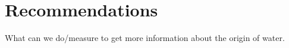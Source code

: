 
\section{Recommendations}
What can we do/measure to get more information about the origin of water.